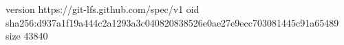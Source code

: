 version https://git-lfs.github.com/spec/v1
oid sha256:d937a1f19a444c2a1293a3c040820838526e0ae27e9ecc703081445c91a65489
size 43840
